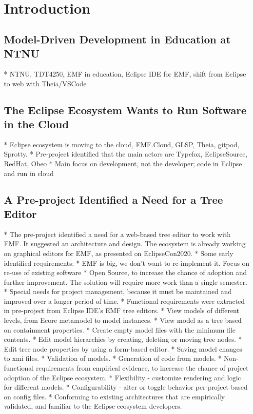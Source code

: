 \chapter{Introduction}\label{chap:introduction}

\section{Model-Driven Development in Education at NTNU}

* NTNU, TDT4250, EMF in education, Eclipse IDE for EMF, shift from Eclipse to web with Theia/VSCode

\section{The Eclipse Ecosystem Wants to Run Software in the Cloud}

* Eclipse ecosystem is moving to the cloud, EMF.Cloud, GLSP, Theia, gitpod, Sprotty.
  * Pre-project identified that the main actors are Typefox, EclipseSource, RedHat, Obeo
  * Main focus on development, not the developer; code in Eclipse and run in cloud

\section{A Pre-project Identified a Need for a Tree Editor}

* The pre-project identified a need for a web-based tree editor to work with EMF. It suggested an architecture and design. The ecosystem is already working on graphical editors for EMF, as presented on EclipseCon2020.
  * Some early identified requirements:
    * EMF is big, we don't want to re-implement it. Focus on re-use of existing software
    * Open Source, to increase the chance of adoption and further improvement. The solution will require more work than a single semester.
    * Special needs for project management, because it must be maintained and improved over a longer period of time.
  * Functional requirements were extracted in pre-project from Eclipse IDE's EMF tree editors.
    * View models of different levels, from Ecore metamodel to model instances.
    * View model as a tree based on containment properties.
    * Create empty model files with the minimum file contents.
    * Edit model hierarchies by creating, deleting or moving tree nodes.
    * Edit tree node properties by using a form-based editor.
    * Saving model changes to xmi files.
    * Validation of models.
    * Generation of code from models.
  * Non-functional requirements from empirical evidence, to increase the chance of project adoption of the Eclipse ecosystem.
    * Flexibility - customize rendering and logic for different models.
    * Configurability - alter or toggle behavior per-project based on config files.
    * Conforming to existing architectures that are empirically validated, and familiar to the Eclipse ecosystem developers.